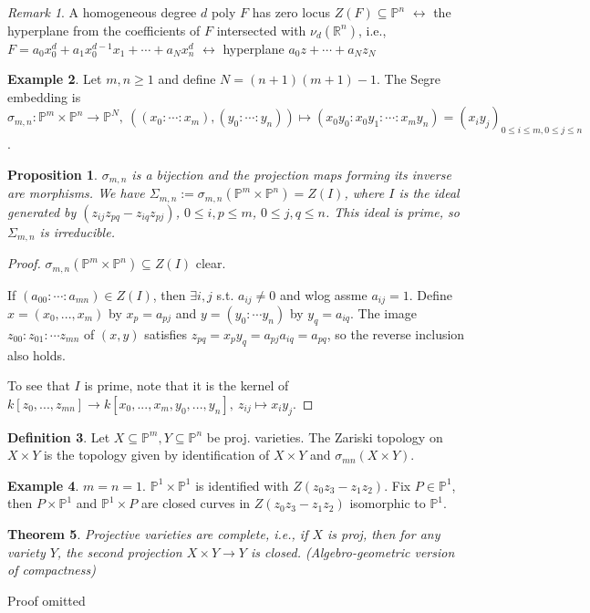 \documentclass{article}
\theoremstyle{definition}
\newtheorem{defn}{Definition}[section]
\newtheorem{example}[defn]{Example}
\theoremstyle{remark}
\newtheorem{rem}{Remark}
\theoremstyle{plain}
\newtheorem{thm}[defn]{Theorem}
\newtheorem{prop}[defn]{Proposition}
\newcommand{\RR}{\mathbb{R}}
\newcommand{\PP}{\mathbb{P}}
\begin{document}
\begin{rem}
    A homogeneous degree $d$ poly $F$ has zero locus $Z(F)\subseteq\PP^n$ $\leftrightarrow$ the hyperplane from the coefficients of $F$ intersected with $\nu_d(\RR^n)$, i.e., $F=a_0x_0^d+a_1x_0^{d-1}x_1+\cdots+a_Nx_n^d$ $\leftrightarrow$ hyperplane $a_0z+\cdots+a_Nz_N$
\end{rem}
\begin{example}
    Let $m,n\ge 1$ and define $N=(n+1)(m+1)-1$. The Segre embedding is $\sigma_{m,n}:\PP^m\times\PP^n\to\PP^N,\ ((x_0:\cdots:x_m),(y_0:\cdots:y_n))\mapsto(x_0y_0:x_0y_1:\cdots:x_my_n)=(x_iy_j)_{0\le i\le m,0\le j\le n}$.
    \begin{prop}
        $\sigma_{m,n}$ is a bijection and the projection maps forming its inverse are morphisms. We have $\Sigma_{m,n}:=\sigma_{m,n}(\PP^m\times\PP^n)=Z(I)$, where $I$ is the ideal generated by $(z_{ij}z_{pq}-z_{iq}z_{pj})$, $0\le i,p\le m$, $0\le j,q\le n$. This ideal is prime, so $\Sigma_{m,n}$ is irreducible.
    \end{prop}
    \begin{proof}
        $\sigma_{m,n}(\PP^m\times\PP^n)\subseteq Z(I)$ clear.

        If $(a_{00}:\cdots:a_{mn})\in Z(I)$, then $\exists i,j$ s.t. $a_{ij}\neq 0$ and wlog assme $a_{ij}=1$. Define $x=(x_0,...,x_m)$ by $x_p=a_{pj}$ and $y=(y_0:\cdots y_n)$ by $y_q=a_{iq}$. The image $z_{00}:z_{01}:\cdots z_{mn}$ of $(x,y)$ satisfies $z_{pq}=x_py_q=a_{pj}a_{iq}=a_{pq}$, so the reverse inclusion also holds.

        To see that $I$ is prime, note that it is the kernel of $k[z_0,...,z_{mn}]\to k[x_0,...,x_m,y_0,...,y_n],\ z_{ij}\mapsto x_iy_j$.
    \end{proof}
\end{example}
\begin{defn}
    Let $X\subseteq\PP^m, Y\subseteq\PP^n$ be proj. varieties. The Zariski topology on $X\times Y$ is the topology given by identification of $X\times Y$ and $\sigma_{mn}(X\times Y)$.
\end{defn}
\begin{example}
    $m=n=1$. $\PP^1\times\PP^1$ is identified with $Z(z_0z_3-z_1z_2)$. Fix $P\in\PP^1$, then $P\times\PP^1$ and $\PP^1\times P$ are closed curves in $Z(z_0z_3-z_1z_2)$ isomorphic to $\PP^1$.
\end{example}

\begin{thm}
    Projective varieties are complete, i.e., if $X$ is proj, then for any variety $Y$, the second projection $X\times Y\to Y$ is closed. (Algebro-geometric version of compactness)
\end{thm}
Proof omitted
\end{document}
